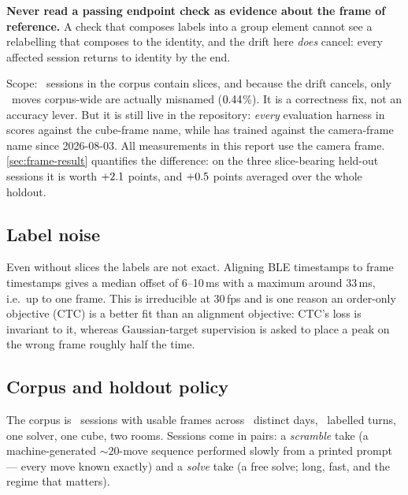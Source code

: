 \begin{keybox}
\textbf{Never read a passing endpoint check as evidence about the frame of
reference.} A check that composes labels into a group element cannot see a
relabelling that composes to the identity, and the drift here \emph{does}
cancel: every affected session returns to identity by the end.
\end{keybox}

Scope: \SliceSessions\ sessions in the corpus contain slices, and because the drift
cancels, only \SliceMoves\ moves corpus-wide are actually misnamed
($0.44$\%). It is a correctness fix, not an accuracy lever. But it
is still live in the repository: \emph{every} evaluation harness in
 scores against the cube-frame name, while
 has trained against the camera-frame name since
2026-08-03. All measurements in this report use the camera frame.
\cref{sec:frame-result} quantifies the difference: on the three
slice-bearing held-out sessions it is worth $+2.1$ points, and
$+0.5$ points averaged over the whole holdout.

\subsection{Label noise}
\label{sec:labelnoise}

Even without slices the labels are not exact. Aligning BLE timestamps to
frame timestamps gives a median offset of 6--10\,ms with a maximum around
33\,ms, i.e.\ up to one frame. This is irreducible at 30\,fps and is one
reason an order-only objective (CTC) is a better fit than an alignment
objective: CTC's loss is invariant to it, whereas Gaussian-target
supervision is asked to place a peak on the wrong frame roughly half the
time.

\subsection{Corpus and holdout policy}
\label{sec:holdout-hygiene}

The corpus is \NSessionsFrames\ sessions with usable frames across
\NDays\ distinct days, \NMovesTotal\ labelled turns, one solver, one cube,
two rooms. Sessions come in pairs: a \emph{scramble} take (a
machine-generated ${\sim}20$-move sequence performed slowly from a printed
prompt --- every move known exactly) and a \emph{solve} take (a free solve;
long, fast, and the regime that matters).

